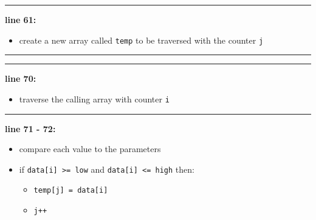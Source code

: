 \vspace{0.1cm}
\noindent
\textcolor{RedOrange}{\rule{\textwidth}{0.5pt}}
\vspace{-0.1cm}

\noindent
\begin{minipage}{0.15\textwidth}
    \textcolor{RedOrange}{\textbf{line 61:}}
\end{minipage}
\begin{minipage}{0.85\textwidth}
    \begin{itemize}
        \item[] create a new array called \texttt{temp} to be traversed with the counter \texttt{j}
    \end{itemize}
\end{minipage}

\vspace{0.1cm}
\noindent
\textcolor{RedOrange}{\rule{\textwidth}{0.5pt}}
\vspace{-0.1cm}

\newpage

\vspace{0.1cm}
\noindent
\textcolor{RedOrange}{\rule{\textwidth}{0.5pt}}
\vspace{-0.1cm}

\noindent
\begin{minipage}{0.15\textwidth}
    \textcolor{RedOrange}{\textbf{line 70:}}
\end{minipage}
\begin{minipage}{0.85\textwidth}
    \begin{itemize}
        \item[] traverse the calling array with counter \texttt{i}
    \end{itemize}
\end{minipage}

\vspace{0.1cm}
\noindent
\textcolor{RedOrange}{\rule{\textwidth}{0.5pt}}
\vspace{-0.1cm}


\noindent
\begin{minipage}{0.15\textwidth}
    \textcolor{RedOrange}{\textbf{line 71 - 72:}}
\end{minipage}
\begin{minipage}{0.85\textwidth}
    \begin{itemize}
        \item[] compare each value to the parameters
        \item[] if \texttt{data[i] >= low} and \texttt{data[i] <= high} then:
            \begin{itemize}
                \item[] \texttt{temp[j] = data[i]}
                \item[] \texttt{j++}
            \end{itemize}
    \end{itemize}
\end{minipage}

